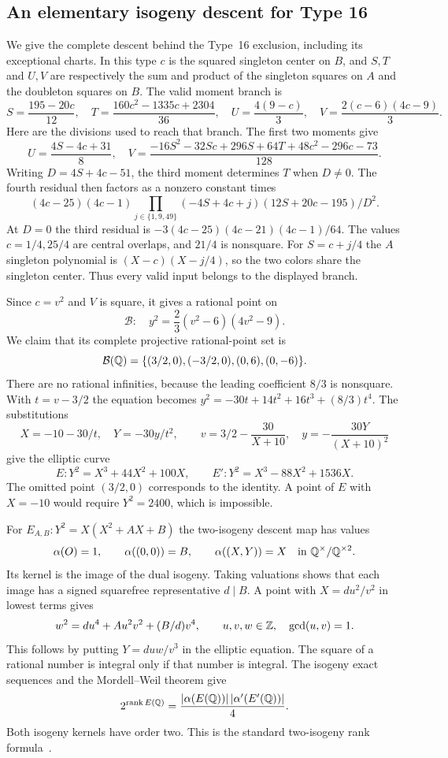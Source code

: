 \subsection{An elementary isogeny descent for Type 16}\label{detail:type16}
We give the complete descent behind the Type~16 exclusion, including its
exceptional charts. In this type $c$ is the squared singleton center on
$B$, and $S,T$ and $U,V$ are respectively the sum and product of the
singleton squares on $A$ and the doubleton squares on $B$. The valid
moment branch is
\[
 S=\frac{195-20c}{12},\quad T=\frac{160c^2-1335c+2304}{36},
 \quad U=\frac{4(9-c)}3,\quad V=\frac{2(c-6)(4c-9)}3.
\]
Here are the divisions used to reach that branch. The first two moments give
\[
 U=\frac{4S-4c+31}{8},\quad
 V=\frac{-16S^2-32Sc+296S+64T+48c^2-296c-73}{128}.
\]
Writing $D=4S+4c-51$, the third moment determines $T$ when $D\ne0$.
The fourth residual then factors as a nonzero constant times
\[
 (4c-25)(4c-1)\prod_{j\in\{1,9,49\}}(-4S+4c+j)
 (12S+20c-195)/D^2.
\]
At $D=0$ the third residual is $-3(4c-25)(4c-21)(4c-1)/64$.
The values $c=1/4,25/4$ are central overlaps, and $21/4$ is nonsquare.
For $S=c+j/4$ the $A$ singleton polynomial is $(X-c)(X-j/4)$,
so the two colors share the singleton center. Thus every valid input
belongs to the displayed branch.

Since $c=v^2$ and $V$ is square, it gives a rational point on
\[
 \mathcal B:\quad y^2=\frac23(v^2-6)(4v^2-9).
\]
We claim that its complete projective rational-point set is
\[
 \mathcal B(\mathbb Q)=\{(3/2,0),(-3/2,0),(0,6),(0,-6)\}.
\]
There are no rational infinities, because the leading coefficient $8/3$
is nonsquare. With $t=v-3/2$ the equation becomes
$y^2=-30t+14t^2+16t^3+(8/3)t^4$. The substitutions
\[
 X=-10-30/t,\quad Y=-30y/t^2,
 \qquad v=3/2-\frac{30}{X+10},\quad y=-\frac{30Y}{(X+10)^2}
\]
give the elliptic curve
\[
 E:Y^2=X^3+44X^2+100X,
 \qquad E':Y^2=X^3-88X^2+1536X.
\]
The omitted point $(3/2,0)$ corresponds to the identity. A point of $E$
with $X=-10$ would require $Y^2=2400$, which is impossible.

For $E_{A,B}:Y^2=X(X^2+AX+B)$ the two-isogeny descent map has values
\[
 \alpha(O)=1,\qquad \alpha((0,0))=B,\qquad
 \alpha((X,Y))=X\quad\text{in }\mathbb Q^\times/\mathbb Q^{\times2}.
\]
Its kernel is the image of the dual isogeny. Taking valuations shows that
each image has a signed squarefree representative $d\mid B$. A point
with $X=du^2/v^2$ in lowest terms gives
\begin{equation}\label{eq:early-isogeny-quartic}
 w^2=du^4+Au^2v^2+(B/d)v^4,\qquad u,v,w\in\mathbb Z,
 \quad\gcd(u,v)=1.
\end{equation}
This follows by putting $Y=duw/v^3$ in the elliptic equation.
The square of a rational number is integral only if that number is
integral. The isogeny exact sequences and the Mordell--Weil theorem give
\begin{equation}\label{eq:early-isogeny-rank}
 2^{\operatorname{rank}E(\mathbb Q)}
 =\frac{|\alpha(E(\mathbb Q))|\,|\alpha'(E'(\mathbb Q))|}{4}.
\end{equation}
Both isogeny kernels have order two. This is the standard two-isogeny
rank formula~\cite[\S2]{FisherHigher}.

